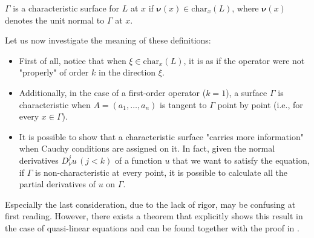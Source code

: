 \begin{definition} \label{supcarlin}
$\Gamma$ is a characteristic surface for $L$ at $x$ if $\boldsymbol{\nu}(x) \in\text{char}_x (L)$, where $\boldsymbol{\nu}(x)$ denotes the unit normal to $\Gamma$ at $x$.
\end{definition}

Let us now investigate the meaning of these definitions:
\begin{itemize}
\item First of all, notice that when $\xi \in \text{char}_x (L)$, it is as if the operator were not "properly" of order $k$ in the direction $\xi$.
\item Additionally, in the case of a first-order operator ($k=1$), a surface $\Gamma$ is characteristic when $A=(a_1,\ldots ,a_n)$ is tangent to $\Gamma$ point by point (i.e., for every $x\in \Gamma$).
\item It is possible to show that a characteristic surface "carries more information" when Cauchy conditions are assigned on it. In fact, given the normal derivatives $D^j_\nu u \,(j<k)$ of a function $u$ that we want to satisfy the equation, if $\Gamma$ is non-characteristic at every point, it is possible to calculate all the partial derivatives of $u$ on $\Gamma$.
\end{itemize}
\newpage
Especially the last consideration, due to the lack of rigor, may be confusing at first reading. However, there exists a theorem that explicitly shows this result in the case of quasi-linear equations and can be found together with the proof in \cite[cap.4.6]{Evans}.

